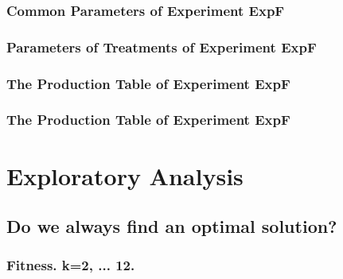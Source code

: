 \documentclass[18pt,c]{beamer}
\begin{document}
 \begin{frame}
 \fontsize{8pt}{9pt}\selectfont
 \frametitle{ Common Parameters of Experiment ExpF }

 \label{ExpFCommonTable001.tex}  
 \end{frame}

 \begin{frame}
 \fontsize{8pt}{9pt}\selectfont
 \frametitle{ Parameters of Treatments of Experiment ExpF }

 \label{ExpFDifferentTable000.tex}  
 \end{frame}

 \begin{frame}
 \fontsize{8pt}{9pt}\selectfont
 \frametitle{ The Production Table of Experiment ExpF }

 \label{ExpFGrammarTable000.tex}  
 \end{frame}

 \begin{frame}
 \fontsize{8pt}{9pt}\selectfont
 \frametitle{ The Production Table of Experiment ExpF }

 \label{ExpFGrammarTable001.tex}  
 \end{frame}

\clearpage
\section{Exploratory Analysis}
\clearpage
\subsection{Do we always find an optimal solution?}
 \begin{frame}
 \fontsize{8pt}{9pt}\selectfont
 \frametitle{ Fitness. k=2, ... 12. }

 \label{ExpFStatsTable000.tex}  
 \end{frame}
\end{document}
